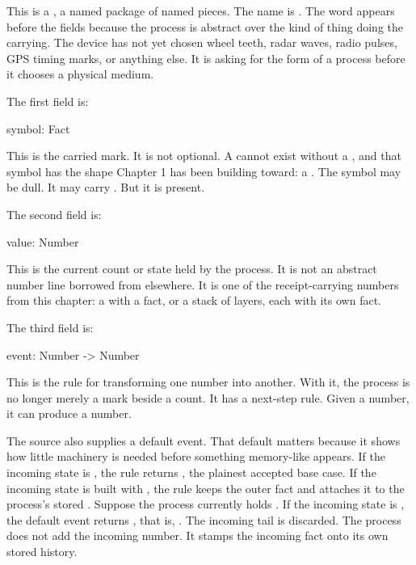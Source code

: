 This is a , a named package of named pieces. The name is
. The word  appears before the fields
because the process is abstract over the kind of thing doing the carrying. The
device has not yet chosen wheel teeth, radar waves, radio pulses, GPS timing
marks, or anything else. It is asking for the form of a process before it
chooses a physical medium.

The first field is:

\begin{leancode}
symbol: Fact
\end{leancode}

This is the carried mark. It is not optional. A  cannot
exist without a , and that symbol has the shape Chapter 1 has been
building toward: a . The symbol may be dull. It may carry
. But it is present.

The second field is:

\begin{leancode}
value: Number
\end{leancode}

This is the current count or state held by the process. It is not an abstract
number line borrowed from elsewhere. It is one of the receipt-carrying numbers
from this chapter: a  with a fact, or a stack of  layers,
each with its own fact.

The third field is:

\begin{leancode}
event: Number -> Number
\end{leancode}

This is the rule for transforming one number into another. With it, the process
is no longer merely a mark beside a count. It has a next-step rule. Given a
number, it can produce a number.

The source also supplies a default event. That default matters because it shows
how little machinery is needed before something memory-like appears. If the
incoming state is , the rule returns , the
plainest accepted base case. If the incoming state is built with , the
rule keeps the outer fact  and attaches it to the process's stored
. Suppose the process currently holds
. If the incoming state is
, the default event returns , that is,
. The incoming tail  is discarded.
The process does not add the incoming number. It stamps the incoming fact onto
its own stored history.

